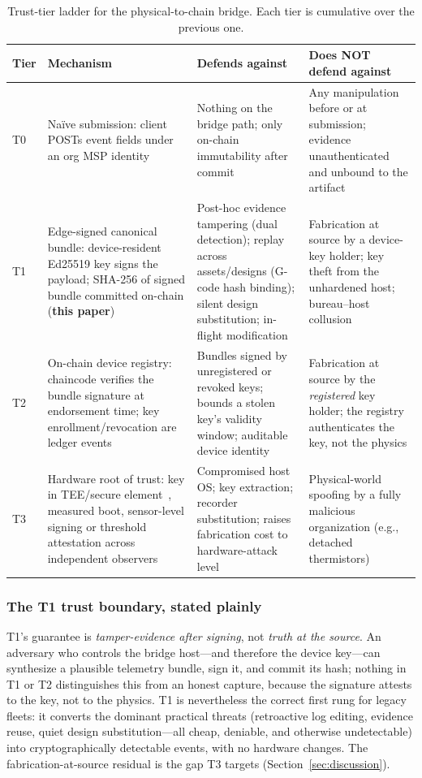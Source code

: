 \begin{table}[t]
\caption{Trust-tier ladder for the physical-to-chain bridge.  Each tier is cumulative over the previous one.}
\label{tab:tiers}
\centering
\scriptsize
\begin{tabular}{@{}lp{3.9cm}p{4.9cm}p{4.9cm}@{}}
\toprule
\textbf{Tier} & \textbf{Mechanism} & \textbf{Defends against} & \textbf{Does NOT defend against} \\
\midrule
T0 & Na\"ive submission: client POSTs event fields under an org MSP
identity &
Nothing on the bridge path; only on-chain immutability after commit &
Any manipulation before or at submission; evidence unauthenticated and
unbound to the artifact \\
\addlinespace
T1 & Edge-signed canonical bundle: device-resident Ed25519 key signs the
payload; SHA-256 of signed bundle committed on-chain (\textbf{this
paper}) &
Post-hoc evidence tampering (dual detection); replay across assets/designs
(G-code hash binding); silent design substitution; in-flight modification &
Fabrication at source by a device-key holder; key theft from the
unhardened host; bureau--host collusion \\
\addlinespace
T2 & On-chain device registry: chaincode verifies the bundle signature at
endorsement time; key enrollment/revocation are ledger events &
Bundles signed by unregistered or revoked keys; bounds a stolen key's
validity window; auditable device identity &
Fabrication at source by the \emph{registered} key holder; the registry
authenticates the key, not the physics \\
\addlinespace
T3 & Hardware root of trust: key in TEE/secure
element~\cite{costan2016sgx}, measured boot, sensor-level signing or
threshold attestation across independent observers &
Compromised host OS; key extraction; recorder substitution; raises
fabrication cost to hardware-attack level &
Physical-world spoofing by a fully malicious organization (e.g.,
detached thermistors) \\
\bottomrule
\end{tabular}
\end{table}

\subsubsection{The T1 trust boundary, stated plainly}
\label{sec:boundary}

T1's guarantee is \emph{tamper-evidence after signing}, not \emph{truth at
the source}.  An adversary who controls the bridge host---and therefore
the device key---can synthesize a plausible telemetry bundle, sign it, and
commit its hash; nothing in T1 or T2 distinguishes this from an honest
capture, because the signature attests to the key, not to the physics.  T1
is nevertheless the correct first rung for legacy fleets: it converts the
dominant practical threats (retroactive log editing, evidence reuse, quiet
design substitution---all cheap, deniable, and otherwise undetectable)
into cryptographically detectable events, with no hardware changes.  The
fabrication-at-source residual is the gap T3 targets
(Section~\ref{sec:discussion}).

